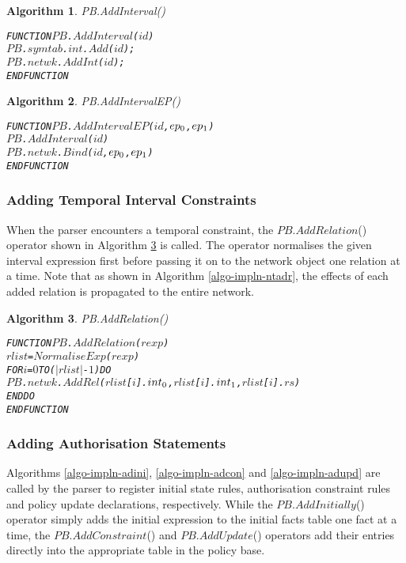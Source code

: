 \documentclass[11pt]{report}
\newenvironment{vverbatim}
{
  \begin{alltt}
}
{
    \vspace{-\baselineskip}
  \end{alltt}
}
\newtheorem{vvalgorithm}{Algorithm}[chapter]
\newenvironment{valgorithm}[2]
{
  \begin{vvalgorithm}{#1}
    \label{#2}
    \small
    \begin{vverbatim}
}
{
    \end{vverbatim}
  \end{vvalgorithm}
}
\begin{document}
          \begin{valgorithm}{PB.AddInterval()}{algo-impln-adint}
FUNCTION \(PB\).\(AddInterval\)(\(id\))
  \(PB\).\(symtab\).\(int\).\(Add\)(\(id\));
  \(PB\).\(netwk\).\(AddInt\)(\(id\));
ENDFUNCTION
          \end{valgorithm}

          \begin{valgorithm}{PB.AddIntervalEP()}{algo-impln-adine}
FUNCTION \(PB\).\(AddIntervalEP\)(\(id\), \(ep\sb{0}\), \(ep\sb{1}\))
  \(PB\).\(AddInterval\)(\(id\))
  \(PB\).\(netwk\).\(Bind\)(\(id\), \(ep\sb{0}\), \(ep\sb{1}\))
ENDFUNCTION
          \end{valgorithm}

        \subsubsection{Adding Temporal Interval Constraints}

          When the parser encounters a temporal constraint, the
          $PB$.$AddRelation$() operator shown in Algorithm
          \ref{algo-impln-adrel} is called. The operator normalises the given
          interval expression first before passing it on to the network object
          one relation at a time. Note that as shown in Algorithm
          \ref{algo-impln-ntadr}, the effects of each added relation is
          propagated to the entire network.

          \begin{valgorithm}{PB.AddRelation()}{algo-impln-adrel}
FUNCTION \(PB\).\(AddRelation\)(\(rexp\))
  \(rlist\) = \(NormaliseExp\)(\(rexp\))
  FOR \(i\) = \(0\) TO (\(|rlist|\) - \(1\)) DO
    \(PB\).\(netwk\).\(AddRel\)(\(rlist\)[\(i\)].\(int\sb{0}\), \(rlist\)[\(i\)].\(int\sb{1}\), \(rlist\)[\(i\)].\(rs\))
  ENDDO
ENDFUNCTION
          \end{valgorithm}

        \subsubsection{Adding Authorisation Statements}

          Algorithms \ref{algo-impln-adini}, \ref{algo-impln-adcon} and
          \ref{algo-impln-adupd} are called by the parser to register initial
          state rules, authorisation constraint rules and policy update
          declarations, respectively. While the $PB$.$AddInitially$() operator
          simply adds the initial expression to the initial facts table
          one fact at a time, the $PB$.$AddConstraint$() and $PB$.$AddUpdate$()
          operators add their entries directly into the appropriate table
          in the policy base.
\end{document}
